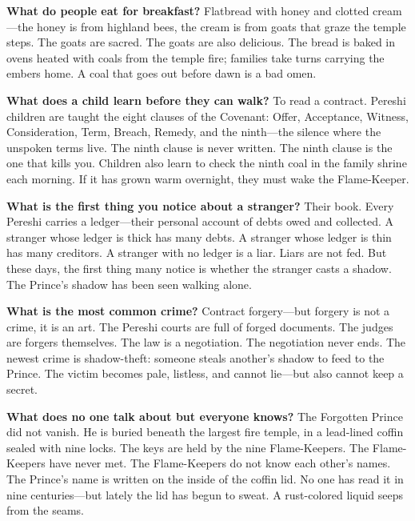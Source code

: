\vspace{1em}

\begin{almanac}
  \textbf{What do people eat for breakfast?} Flatbread with honey and clotted cream---the honey is from highland bees, the cream is from goats that graze the temple steps. The goats are sacred. The goats are also delicious. The bread is baked in ovens heated with coals from the temple fire; families take turns carrying the embers home. A coal that goes out before dawn is a bad omen.
  
  \textbf{What does a child learn before they can walk?} To read a contract. Pereshi children are taught the eight clauses of the Covenant: Offer, Acceptance, Witness, Consideration, Term, Breach, Remedy, and the ninth---the silence where the unspoken terms live. The ninth clause is never written. The ninth clause is the one that kills you. Children also learn to check the ninth coal in the family shrine each morning. If it has grown warm overnight, they must wake the Flame-Keeper.
  
  \textbf{What is the first thing you notice about a stranger?} Their book. Every Pereshi carries a ledger---their personal account of debts owed and collected. A stranger whose ledger is thick has many debts. A stranger whose ledger is thin has many creditors. A stranger with no ledger is a liar. Liars are not fed. But these days, the first thing many notice is whether the stranger casts a shadow. The Prince's shadow has been seen walking alone.
  
  \textbf{What is the most common crime?} Contract forgery---but forgery is not a crime, it is an art. The Pereshi courts are full of forged documents. The judges are forgers themselves. The law is a negotiation. The negotiation never ends. The newest crime is shadow-theft: someone steals another's shadow to feed to the Prince. The victim becomes pale, listless, and cannot lie---but also cannot keep a secret.
  
  \textbf{What does no one talk about but everyone knows?} The Forgotten Prince did not vanish. He is buried beneath the largest fire temple, in a lead-lined coffin sealed with nine locks. The keys are held by the nine Flame-Keepers. The Flame-Keepers have never met. The Flame-Keepers do not know each other's names. The Prince's name is written on the inside of the coffin lid. No one has read it in nine centuries---but lately the lid has begun to sweat. A rust-colored liquid seeps from the seams.
  

\end{almanac}
